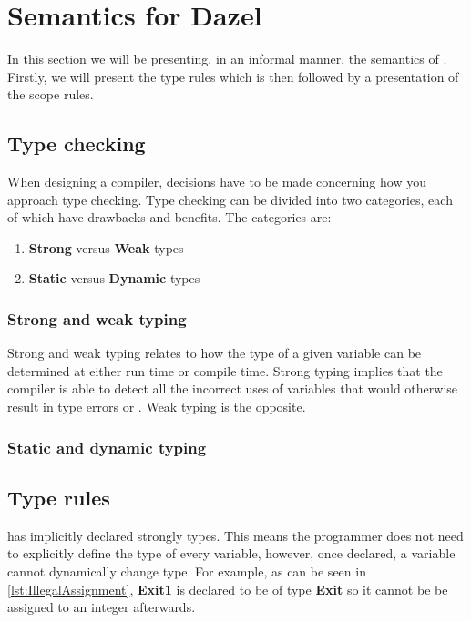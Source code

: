 \section{Semantics for Dazel}

In this section we will be presenting, in an informal manner, the semantics of \dazel.
Firstly, we will present the type rules which is then followed by a presentation of the scope rules.

\subsection*{Type checking}

When designing a compiler, decisions have to be made concerning how you approach type checking. Type checking can be divided into two categories, each of which have
drawbacks and benefits. The categories are:

\begin{enumerate}
	\item \textbf{Strong} versus \textbf{Weak} types
	\item \textbf{Static} versus \textbf{Dynamic} types
\end{enumerate}

\subsubsection*{Strong and weak typing}
Strong and weak typing relates to how the type of a given variable can be determined at either run time or compile time. Strong typing implies that the compiler is
able to detect all the incorrect uses of variables that would otherwise result in type errors or . Weak typing is the opposite.

\subsubsection*{Static and dynamic typing}

\subsection*{Type rules}
\dazel has implicitly declared strongly types.
This means the programmer does not need to explicitly define the type of every variable, however, once declared, a variable
cannot dynamically change type.
For example, as can be seen in \ref{lst:IllegalAssignment}, \textbf{Exit1} is declared to be of type \textbf{Exit} so it cannot be be
assigned to an integer afterwards.

